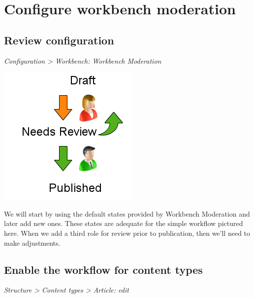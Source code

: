 \documentclass[letterpaper,10pt,english]{sphinxmanual}
\begin{document}
\chapter{Configure workbench moderation}
\label{moderation:configure-workbench-moderation}

\section{Review configuration}
\label{moderation:review-configuration}
\emph{Configuration \textgreater{} Workbench: Workbench Moderation}

{\includegraphics{sites/default/files/recipes/moderation/workflow_simple.png}\hfill}

We will start by using the default states provided by Workbench Moderation and later add new ones. These states are adequate for the simple workflow pictured here. When we add a third role for review prior to publication, then we'll need to make adjustments.


\section{Enable the workflow for content types}
\label{moderation:enable-the-workflow-for-content-types}
\emph{Structure \textgreater{} Content types \textgreater{} Article: edit}
\end{document}
